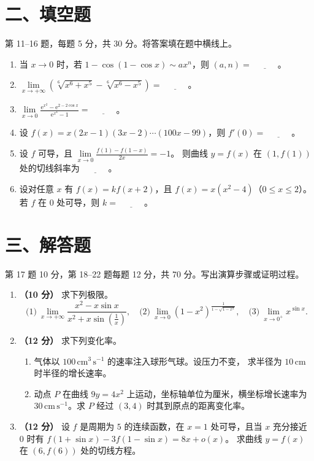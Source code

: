 \documentclass[UTF8,a4paper,zihao=-4,fontset=fandol]{ctexart}
\renewcommand{\lim}{\operatorname*{lim}\limits}
\newcommand{\blank}{\underline{\hspace{3em}}}
\newcommand{\fillsection}{%
  \section*{二、填空题}
  第 11--16 题，每题 5 分，共 30 分。将答案填在题中横线上。}
\newcommand{\solvesection}{%
  \newpage
  \section*{三、解答题}
  第 17 题 10 分，第 18--22 题每题 12 分，共 70 分。写出演算步骤或证明过程。}
\begin{document}
\fillsection
\begin{enumerate}[start=11]
\item 当 $x\to0$ 时，若 $1-\cos(1-\cos x)\sim ax^n$，则 $(a,n)=\blank$。
\item $\displaystyle\lim_{x\to+\infty}\left(\sqrt[6]{x^6+x^5}-\sqrt[6]{x^6-x^5}\right)=\blank$。
\item $\displaystyle\lim_{x\to0}\frac{\mathrm{e}^{x^2}-\mathrm{e}^{2-2\cos x}}{\mathrm{e}^{x^4}-1}=\blank$。
\item 设 $f(x)=x(2x-1)(3x-2)\cdots(100x-99)$，则 $f'(0)=\blank$。
\item 设 $f$ 可导，且 $\displaystyle\lim_{x\to0}\frac{f(1)-f(1-x)}{2x}=-1$。
则曲线 $y=f(x)$ 在 $(1,f(1))$ 处的切线斜率为 $\blank$。
\item 设对任意 $x$ 有 $f(x)=kf(x+2)$，且 $f(x)=x(x^2-4)$（$0\le x\le2$）。
若 $f$ 在 $0$ 处可导，则 $k=\blank$。
\end{enumerate}
\solvesection
\begin{enumerate}[start=17]
\item \textbf{（10 分）} 求下列极限。
\[
 \text{(1)}\ \lim_{x\to+\infty}\frac{x^2-x\sin x}{x^2+x\sin(\frac{1}{x})},
 \quad
 \text{(2)}\ \lim_{x\to0}(1-x^2)^{\frac{1}{1-\sqrt{1-x^2}}},
 \quad
 \text{(3)}\ \lim_{x\to0^+}x^{\sin x}.
\]
\vspace{4.5cm}
\item \textbf{（12 分）} 求下列变化率。
\begin{enumerate}[label=(\arabic*),nosep]
\item 气体以 $100\,\mathrm{cm}^3\,\mathrm{s}^{-1}$ 的速率注入球形气球。设压力不变，
求半径为 $10\,\mathrm{cm}$ 时半径的增长速率。
\item 动点 $P$ 在曲线 $9y=4x^2$ 上运动，坐标轴单位为厘米，横坐标增长速率为
$30\,\mathrm{cm}\,\mathrm{s}^{-1}$。求 $P$ 经过 $(3,4)$ 时其到原点的距离变化率。
\end{enumerate}
\vspace{4.5cm}
\item \textbf{（12 分）} 设 $f$ 是周期为 $5$ 的连续函数，在 $x=1$ 处可导，且当 $x$ 充分接近 $0$ 时有
$f(1+\sin x)-3f(1-\sin x)=8x+o(x)$。
求曲线 $y=f(x)$ 在 $(6,f(6))$ 处的切线方程。
\end{enumerate}
\newpage
\end{document}
